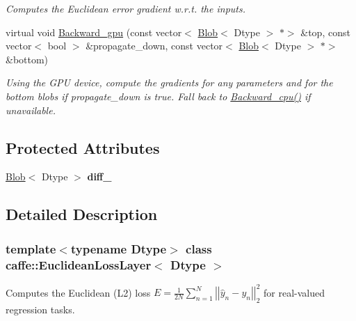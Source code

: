 \begin{DoxyCompactItemize}
\begin{DoxyCompactList}\small\item\em Computes the Euclidean error gradient w.\+r.\+t. the inputs. \end{DoxyCompactList}\item 
\mbox{\label{classcaffe_1_1_euclidean_loss_layer_aa22a0ef4e0ab9d6a77be67c3d967b648}} 
virtual void \mbox{\hyperlink{classcaffe_1_1_euclidean_loss_layer_aa22a0ef4e0ab9d6a77be67c3d967b648}{Backward\+\_\+gpu}} (const vector$<$ \mbox{\hyperlink{classcaffe_1_1_blob}{Blob}}$<$ Dtype $>$ $\ast$$>$ \&top, const vector$<$ bool $>$ \&propagate\+\_\+down, const vector$<$ \mbox{\hyperlink{classcaffe_1_1_blob}{Blob}}$<$ Dtype $>$ $\ast$$>$ \&bottom)
\begin{DoxyCompactList}\small\item\em Using the G\+PU device, compute the gradients for any parameters and for the bottom blobs if propagate\+\_\+down is true. Fall back to \mbox{\hyperlink{classcaffe_1_1_euclidean_loss_layer_a577f5dad9889d01461348a4c89277089}{Backward\+\_\+cpu()}} if unavailable. \end{DoxyCompactList}\end{DoxyCompactItemize}
\subsection*{Protected Attributes}
\begin{DoxyCompactItemize}
\item 
\mbox{\label{classcaffe_1_1_euclidean_loss_layer_af7d2646ce6cf4ee23b69a4f968d0aff0}} 
\mbox{\hyperlink{classcaffe_1_1_blob}{Blob}}$<$ Dtype $>$ {\bfseries diff\+\_\+}
\end{DoxyCompactItemize}


\subsection{Detailed Description}
\subsubsection*{template$<$typename Dtype$>$\newline
class caffe\+::\+Euclidean\+Loss\+Layer$<$ Dtype $>$}

Computes the Euclidean (L2) loss $ E = \frac{1}{2N} \sum\limits_{n=1}^N \left| \left| \hat{y}_n - y_n \right| \right|_2^2 $ for real-\/valued regression tasks. 


